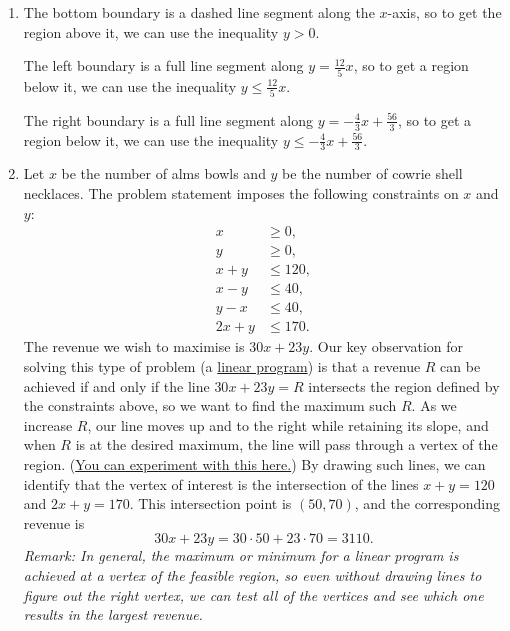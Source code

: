 \begin{enumerate}
\item The bottom boundary is a dashed line segment along the $x$-axis, so to get the region above it, we can use the inequality $\boxed{y > 0}$.\par
The left boundary is a full line segment along $y = \frac{12}{5}x$, so to get a region below it, we can use the inequality $\boxed{y\leq\frac{12}{5}x}$.\par
The right boundary is a full line segment along $y = -\frac{4}{3}x + \frac{56}{3}$, so to get a region below it, we can use the inequality $\boxed{y\leq -\frac{4}{3}x + \frac{56}{3}}$.
\item Let $x$ be the number of alms bowls and $y$ be the number of cowrie shell necklaces. The problem statement imposes the following constraints on $x$ and $y$:
\begin{align*}
x &\geq 0, \\
y &\geq 0, \\
x + y &\leq 120, \tag{maximum stock} \\
x - y &\leq 40, \tag{cannot have too many more bowls} \\
y - x &\leq 40, \tag{cannot have too many more necklaces} \\
2x + y &\leq 170. \tag{materials allowance}
\end{align*}
The revenue we wish to maximise is $30x + 23y$. Our key observation for solving this type of problem (a \href{https://en.wikipedia.org/wiki/Linear_programming}{linear program}) is that a revenue $R$ can be achieved if and only if the line $30x + 23y = R$ intersects the region defined by the constraints above, so we want to find the maximum such $R$. As we increase $R$, our line moves up and to the right while retaining its slope, and when $R$ is at the desired maximum, the line will pass through a vertex of the region. (\href{https://www.desmos.com/calculator/d1towavtsb}{You can experiment with this here.}) By drawing such lines, we can identify that the vertex of interest is the intersection of the lines $x + y = 120$ and $2x + y = 170$. This intersection point is $(50,70)$, and the corresponding revenue is
\begin{equation*}
30x + 23y = 30\cdot 50 + 23\cdot 70 = \boxed{3110}.
\end{equation*}
\emph{Remark: In general, the maximum or minimum for a linear program is achieved at a vertex of the feasible region, so even without drawing lines to figure out the right vertex, we can test all of the vertices and see which one results in the largest revenue.}

\end{enumerate}
